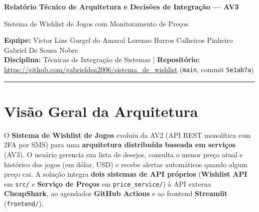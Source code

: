 \documentclass[11pt,a4paper]{article}
\begin{document}
\begin{center}
    {\large\bfseries\color{darkblue} Relatório Técnico de Arquitetura e Decisões de Integração — AV3\par}
    \vspace{2pt}
    {\normalsize\color{primaryblue} Sistema de Wishlist de Jogos com Monitoramento de Preços\par}
    \vspace{4pt}
    {\footnotesize
    \textbf{Equipe:} Victor Lins Gurgel do Amaral \textperiodcentered{} Lorenzo Barros Calheiros Pinheiro \textperiodcentered{} Gabriel De Sousa Nobre\\
    \textbf{Disciplina:} Técnicas de Integração de Sistemas \quad|\quad
    \textbf{Repositório:} \url{https://github.com/gabrieldsn2006/sistema_de_wishlist} (\texttt{main}, commit \texttt{5e1ab7a})
    \par}
\end{center}
\vspace{-4pt}
\hrule
\vspace{6pt}

\section{Visão Geral da Arquitetura}

O \textbf{Sistema de Wishlist de Jogos} evoluiu da AV2 (API REST monolítica com 2FA por SMS) para uma \textbf{arquitetura distribuída baseada em serviços} (AV3). O usuário gerencia sua lista de desejos, consulta o menor preço atual e histórico dos jogos (em dólar, USD) e recebe alertas automáticos quando algum preço cai. A solução integra \textbf{dois sistemas de API próprios} (\textbf{Wishlist API} em \texttt{src/} e \textbf{Serviço de Preços} em \texttt{price\_service/}) à API externa \textbf{CheapShark}, ao agendador \textbf{GitHub Actions} e ao frontend \textbf{Streamlit} (\texttt{frontend/}).
\end{document}

